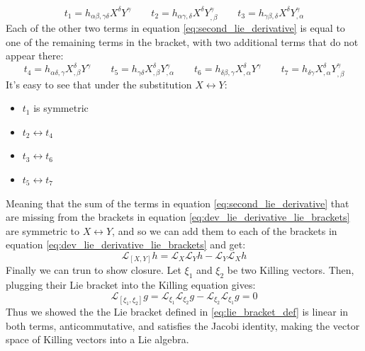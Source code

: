 \documentclass{article}
\begin{document}
\begin{equation}
    t_1 = h_{\alpha\beta,\gamma\delta} X^\delta Y^\gamma \qquad t_2 = h_{\alpha\gamma,\delta}  X^\delta Y^\gamma_{,\beta} \qquad t_3 = h_{\gamma\beta,\delta} X^\delta Y^\gamma_{,\alpha}
\end{equation}
Each of the other two terms in equation \ref{eq:second_lie_derivative} is equal to one of the remaining terms in the bracket, with two additional terms that do not appear there:
\begin{equation}
    t_4 = h_{\alpha\delta,\gamma} X^\delta_{,\beta} Y^\gamma \qquad t_5 = h_{\gamma\delta} X^\delta_{,\beta} Y^\gamma_{,\alpha} \qquad
    t_6 = h_{\delta\beta,\gamma} X^\delta_{,\alpha} Y^\gamma \qquad t_7 = h_{\delta\gamma} X^\delta_{,\alpha} Y^\gamma_{,\beta}
\end{equation}
It's easy to see that under the substitution $X \leftrightarrow Y$:
\begin{itemize}
    \item $t_1$ is symmetric
    \item $t_2 \leftrightarrow t_4$
    \item $t_3 \leftrightarrow t_6$
    \item $t_5 \leftrightarrow t_7$
\end{itemize}
Meaning that the sum of the terms in equation \ref{eq:second_lie_derivative} that are missing from the brackets in equation \ref{eq:dev_lie_derivative_lie_brackets} are symmetric to $X \leftrightarrow Y$, and so we can add them to each of the brackets in equation \ref{eq:dev_lie_derivative_lie_brackets} and get:
\begin{equation}
    \mathcal{L}_{[X,Y]} h = \mathcal{L}_X \mathcal{L}_Y h - \mathcal{L}_Y \mathcal{L}_X h
\end{equation}
Finally we can trun to show closure. Let $\xi_1$ and $\xi_2$ be two Killing vectors. Then, plugging their Lie bracket into the Killing equation gives:
\begin{equation}
    \mathcal{L}_{[\xi_1,\xi_2]}g = \mathcal{L}_{\xi_1} \mathcal{L}_{\xi_2} g - \mathcal{L}_{\xi_2} \mathcal{L}_{\xi_1} g = 0
\end{equation}
Thus we showed the the Lie bracket defined in \ref{eq:lie_bracket_def} is linear in both terms, anticommutative, and satisfies the Jacobi identity, making the vector space of Killing vectors into a Lie algebra.
\end{document}
